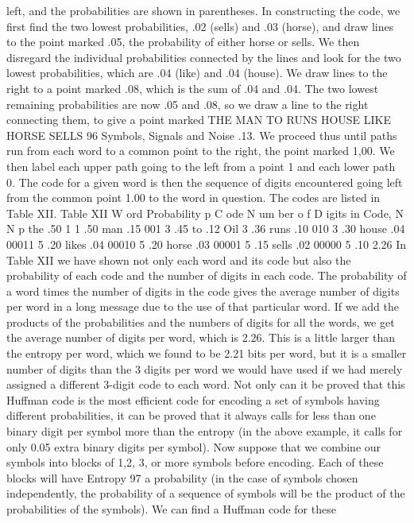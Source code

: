{{{left, and the probabilities are shown in parentheses. In constructing
the code, we first find the two lowest probabilities, .02 (sells)
and .03 (horse), and draw lines to the point marked .05, the probability
of either horse or sells. We then disregard the individual
probabilities connected by the lines and look for the two lowest
probabilities, which are .04 (like) and .04 (house). We draw lines
to the right to a point marked .08, which is the sum of .04 and .04.
The two lowest remaining probabilities are now .05 and .08, so we
draw a line to the right connecting them, to give a point marked
THE
MAN
TO
RUNS
HOUSE
LIKE
HORSE
SELLS
96 Symbols, Signals and Noise
.13. We proceed thus until paths run from each word to a common
point to the right, the point marked 1,00. We then label each upper
path going to the left from a point 1 and each lower path 0. The
code for a given word is then the sequence of digits encountered
going left from the common point 1.00 to the word in question.
The codes are listed in Table XII.
Table XII
W ord Probability p C ode N um ber o f D igits
in Code, N N p
the .50 1 1 .50
man .15 001 3 .45
to .12 Oil 3 .36
runs .10 010 3 .30
house .04 00011 5 .20
likes .04 00010 5 .20
horse .03 00001 5 .15
sells .02 00000 5 .10
2.26
In Table XII we have shown not only each word and its code
but also the probability of each code and the number of digits in
each code. The probability of a word times the number of digits
in the code gives the average number of digits per word in a long
message due to the use of that particular word. If we add the
products of the probabilities and the numbers of digits for all the
words, we get the average number of digits per word, which is 2.26.
This is a little larger than the entropy per word, which we found
to be 2.21 bits per word, but it is a smaller number of digits than
the 3 digits per word we would have used if we had merely assigned
a different 3-digit code to each word.
Not only can it be proved that this Huffman code is the most
efficient code for encoding a set of symbols having different probabilities,
it can be proved that it always calls for less than one
binary digit per symbol more than the entropy (in the above
example, it calls for only 0.05 extra binary digits per symbol).
Now suppose that we combine our symbols into blocks of 1,2,
3, or more symbols before encoding. Each of these blocks will have
Entropy 97
a probability (in the case of symbols chosen independently, the
probability of a sequence of symbols will be the product of the
probabilities of the symbols). We can find a Huffman code for these
}}}
